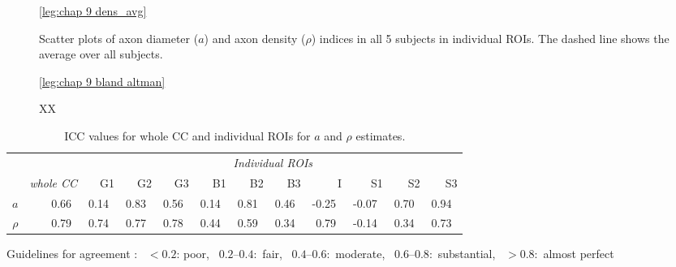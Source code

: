 \begin{figure}[ht]
	\centering
	\ref{leg:chap 9 dens_avg}\\	
	\caption{Scatter plots of axon diameter ($a$) and axon density ($\rho$) indices in all 5 subjects in individual ROIs. The dashed line shows the average over all subjects.}
	\label{fig:chap9 scan rescan scatterplots per subject}
\end{figure}

\begin{figure}[ht]
	\centering
	\ref{leg:chap 9 bland altman}	
	\caption{XX}
	\label{fig:chap9 bland altman plot}	
\end{figure}	



\begin{table}[ht]
\caption{ICC values for whole CC and individual ROIs for $a$ and $\rho$ estimates.}
\begin{adjustbox}{width={\textwidth},totalheight=\textheight,keepaspectratio}
\begin{tabular}{rrrrrrrrrrrr}
      \toprule
       & & \multicolumn{10}{c}{\textit{Individual ROIs}}                                             \\
       & \textit{whole CC} & G1    & G2    & G3    & B1    & B2    & B3    & I     & S1    & S2    & S3\\
       \cmidrule(rl){2-2} \cmidrule(l){3-12}
       \addlinespace
$a$    & 0.66~\usebox{\substantialBox} & 0.14~\usebox{\poorBox}  & 0.83~\usebox{\perfectBox} & 0.56~\usebox{\moderateBox}  & 0.14~\usebox{\poorBox}  & 0.81~\usebox{\perfectBox}  & 0.46~\usebox{\moderateBox}  & -0.25~\usebox{\poorBox} & -0.07~\usebox{\poorBox} & 0.70~\usebox{\substantialBox}  & 0.94~\usebox{\perfectBox}  \\
$\rho$ & 0.79~\usebox{\substantialBox} & 0.74~\usebox{\substantialBox}  & 0.77~\usebox{\substantialBox}  & 0.78~\usebox{\substantialBox}  & 0.44~\usebox{\moderateBox}  & 0.59~\usebox{\moderateBox}  & 0.34~\usebox{\fairBox}  & 0.79~\usebox{\substantialBox}  & -0.14~\usebox{\poorBox} & 0.34~\usebox{\fairBox}  & 0.73~\usebox{\substantialBox}  \\
\bottomrule
\end{tabular}
\end{adjustbox}
{\footnotesize Guidelines for agreement  \citep{Landis:1977}: \usebox{\poorBox}~$<0.2$: poor,  \usebox{\fairBox}~$0.2–0.4$:~fair,  \usebox{\moderateBox}~$0.4–0.6$:~moderate, \usebox{\substantialBox}~$0.6–0.8$:~substantial,  \usebox{\perfectBox}~$>0.8$:~almost perfect}
\end{table}

